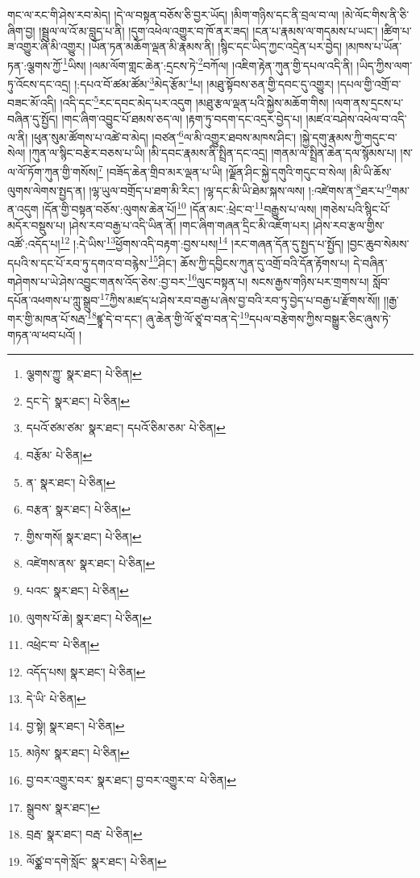 གང་ལ་རང་གི་ཤེས་རབ་མེད། །དེ་ལ་བསྟན་བཅོས་ཅི་བྱར་ཡོད། །མིག་གཉིས་དང་ནི་བྲལ་བ་ལ། །མེ་ལོང་གིས་ནི་ཅི་ཞིག་བྱ། །སྦྲུལ་ལ་འོ་མ་བླུད་པ་ནི། །དུག་འཕེལ་འགྱུར་བ་ཁོ་ནར་ཟད། །ངན་པ་རྣམས་ལ་གདམས་པ་ཡང་། །ཚིག་པ་ཟ་འགྱུར་ཞི་མི་འགྱུར། །ཡོན་ཏན་མཆོག་ལྡན་མི་རྣམས་ནི། །སྙིང་དང་ཡིད་ཀྱང་འདྲེན་པར་བྱེད། །མཁས་པ་ཡོན་ཏན་:ལྕགས་ཀྱོ་\footnote{ལྕགས་ཀྱུ་  སྣར་ཐང་།  པེ་ཅིན། }ཡིས། །ལམ་ལོག་གླང་ཆེན་:དྲངས་ཏེ་\footnote{དྲང་དེ་  སྣར་ཐང་།  པེ་ཅིན། }བཀོལ། །འཇིག་རྟེན་ཀུན་གྱི་དཔལ་འདི་ནི། །ཡིད་ཀྱིས་ལག་ཏུ་འོངས་དང་འདྲ། །:དཔའ་བོ་ཚམ་ཚོམ་\footnote{དཔའོ་ཙམ་ཙམ་  སྣར་ཐང་། དཔའོ་ཅིམ་ཅམ་  པེ་ཅིན། }མེད་རྩོམ་\footnote{བརྩོམ་  པེ་ཅིན། }པ། །མཐུ་སྟོབས་ཅན་གྱི་དབང་དུ་འགྱུར། །དཔལ་གྱི་འགྲོ་བ་བཟང་མོ་འདི། །འདི་དང་\footnote{ན་  སྣར་ཐང་།  པེ་ཅིན། }རང་དབང་མེད་པར་འདུག །མཐུ་རྩལ་ལྡན་པའི་སྐྱེས་མཆོག་གིས། །ལག་ནས་དྲངས་པ་བཞིན་དུ་སྤྱོད། །གང་ཞིག་འབྱུང་པོ་ཐམས་ཅད་ལ། །རྟག་ཏུ་བདག་དང་འདྲར་བྱེད་པ། །མཛའ་བཤེས་འཕེལ་བ་འདི་ལ་ནི། །ཕུན་སུམ་ཚོགས་པ་འཚེ་བ་མེད། །བཙན་\footnote{བརྩན་  སྣར་ཐང་།  པེ་ཅིན། }ལ་མི་འགྱུར་ཐབས་མཁས་ཤིང་། །སྐྱེ་དགུ་རྣམས་ཀྱི་གདུང་བ་སེལ། །ཀུན་ལ་སྙིང་བརྩེར་བཅས་པ་ཡི། །མི་དབང་རྣམས་ནི་སྤྲིན་དང་འདྲ། །གནམ་ལ་སྤྲིན་ཆེན་དལ་སྙོམས་པ། །ས་ལ་ལོ་ཏོག་ཀུན་གྱི་གསོས།\footnote{གྱིས་གསོ།  སྣར་ཐང་།  པེ་ཅིན། } །བཟོད་ཆེན་གྲིབ་མར་ལྡན་པ་ཡི། །ལྗོན་ཤིང་སྐྱེ་དགུའི་གདུང་བ་སེལ། །མི་ཡི་ཆོས་ལུགས་ལེགས་སྤྱད་ན། །ལྷ་ཡུལ་བགྲོད་པ་ཐག་མི་རིང་། །ལྷ་དང་མི་ཡི་ཐེམ་སྐས་ལས། །:འཛེགས་ན་\footnote{འཛེགས་ནས་  སྣར་ཐང་།  པེ་ཅིན། }ཐར་པ་\footnote{པའང་  སྣར་ཐང་།  པེ་ཅིན། }གམ་ན་འདུག །དོན་གྱི་བསྟན་བཅོས་:ལུགས་ཆེན་པོ།\footnote{ལུགས་པོ་ཆེ།  སྣར་ཐང་།  པེ་ཅིན། } །དོན་མང་:ཕྲེང་བ་\footnote{འཕྲེང་བ་  པེ་ཅིན། }བརྒྱུས་པ་ལས། །གཅེས་པའི་སྙིང་པོ་མདོར་བསྡུས་པ། །ཤེས་རབ་བརྒྱ་པ་འདི་ཡིན་ནོ། །གང་ཞིག་གཞན་དྲིང་མི་འཇོག་པར། །ཤེས་རབ་རྩལ་གྱིས་འཚོ་:འདོད་པ།\footnote{འདོད་པས།  སྣར་ཐང་།  པེ་ཅིན། } །:དེ་ཡིས་\footnote{དེ་ཡི་  པེ་ཅིན། }ཕྱོགས་འདི་བརྟག་:བྱས་པས།\footnote{བྱ་སྟེ།  སྣར་ཐང་།  པེ་ཅིན། } །རང་གཞན་དོན་དུ་སྤྱད་པ་སྤྱོད། །བྱང་ཆུབ་སེམས་དཔའི་ས་དང་པོ་རབ་ཏུ་དགའ་བ་བརྙེས་\footnote{མཉེས་  སྣར་ཐང་།  པེ་ཅིན། }ཤིང་། ཆོས་ཀྱི་དབྱིངས་ཀུན་དུ་འགྲོ་བའི་དོན་རྟོགས་པ། དེ་བཞིན་གཤེགས་པ་ཡེ་ཤེས་འབྱུང་གནས་འོད་ཅེས་:བྱ་བར་\footnote{བྱ་བར་འགྱུར་བར་  སྣར་ཐང་། བྱ་བར་འགྱུར་བ་  པེ་ཅིན། }ལུང་བསྟན་པ། སངས་རྒྱས་གཉིས་པར་གྲགས་པ། སློབ་དཔོན་འཕགས་པ་ཀླུ་སྒྲུབ་\footnote{སྒྲུབས་  སྣར་ཐང་། }ཀྱིས་མཛད་པ་ཤེས་རབ་བརྒྱ་པ་ཞེས་བྱ་བའི་རབ་ཏུ་བྱེད་པ་བརྒྱ་པ་རྫོགས་སོ།། །།རྒྱ་གར་གྱི་མཁན་པོ་སརྦ་\footnote{བྲརྦ་  སྣར་ཐང་། བརྦ་  པེ་ཅིན། }ཛྙཱ་དེ་བ་དང་། ཞུ་ཆེན་གྱི་ལོ་ཙཱ་བ་བན་དེ་\footnote{ལོཙྪ་བ་དགེ་སློང་  སྣར་ཐང་།  པེ་ཅིན། }དཔལ་བརྩེགས་ཀྱིས་བསྒྱུར་ཅིང་ཞུས་ཏེ་གཏན་ལ་ཕབ་པའོ། ། 